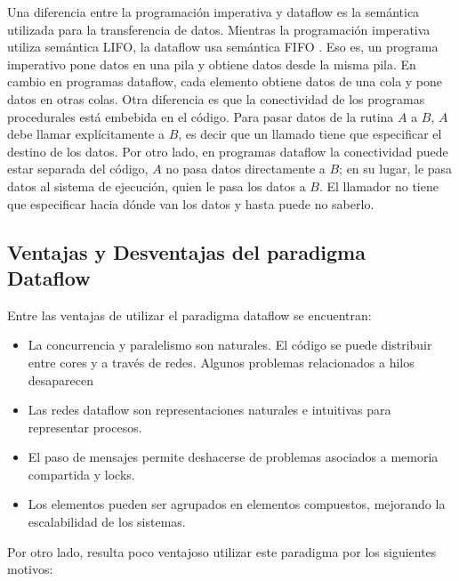 Una diferencia entre la programación imperativa y dataflow es
la semántica utilizada para la transferencia de datos. Mientras la programación
imperativa utiliza semántica LIFO, la dataflow usa semántica FIFO
\cite{DataflowRichardHarter}. Eso es, un programa imperativo pone datos en una
pila y obtiene datos desde la misma pila.
En cambio en programas dataflow, cada elemento obtiene datos de una cola y pone
datos en otras colas.
Otra diferencia es que la conectividad de los programas procedurales está
embebida en el código. Para pasar datos de la rutina $A$ a $B$, $A$ debe
llamar explícitamente a $B$, es decir que un llamado tiene que especificar el
destino de los datos.
Por otro lado, en programas dataflow la conectividad puede estar separada
del código, $A$ no pasa datos directamente a $B$; en su lugar, le pasa datos al
sistema de ejecución, quien le pasa los datos a $B$.
El llamador no tiene que especificar hacia dónde van los datos y hasta puede
no saberlo. \cite{DataflowRichardHarter}

\subsection*{Ventajas y Desventajas del paradigma Dataflow}

Entre las ventajas de utilizar el paradigma dataflow se encuentran:

\begin{itemize}
  \item La concurrencia y paralelismo son naturales. El código se puede distribuir entre cores y a través de redes. Algunos
  problemas relacionados a hilos desaparecen
  \item Las redes dataflow son representaciones naturales e intuitivas para
  representar procesos.
  \item El paso de mensajes permite deshacerse de problemas asociados a memoria compartida y locks.
  \item Los elementos pueden ser agrupados en elementos compuestos, mejorando
  la escalabilidad de los sistemas.
\end{itemize}

Por otro lado, resulta poco ventajoso utilizar este paradigma por los siguientes
motivos:

